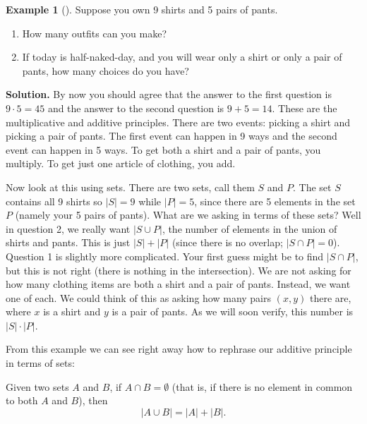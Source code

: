 \documentclass[12pt,]{book}
\theoremstyle{plain}
\theoremstyle{definition}
\theoremstyle{definition}
\newtheorem{example}[theorem]{Example}
\theoremstyle{definition}
\numberwithin{equation}{chapter}
\newcommand{\card}[1]{\left| #1 \right|}
\begin{document}
\begin{example}[]\label{example-39}
\hypertarget{p-731}{}%
Suppose you own 9 shirts and 5 pairs of pants.%
\par
\hypertarget{p-732}{}%
\leavevmode%
\begin{enumerate}
\item\hypertarget{li-345}{}\hypertarget{p-733}{}%
How many outfits can you make?%
\item\hypertarget{li-346}{}\hypertarget{p-734}{}%
If today is half-naked-day, and you will wear only a shirt or only a pair of pants, how many choices do you have?%
\end{enumerate}
%
\par\smallskip%
\noindent\textbf{Solution.}\hypertarget{solution-86}{}\quad%
\hypertarget{p-735}{}%
By now you should agree that the answer to the first question is \(9 \cdot 5 = 45\) and the answer to the second question is \(9 + 5 = 14\). These are the multiplicative and additive principles. There are two events: picking a shirt and picking a pair of pants. The first event can happen in 9 ways and the second event can happen in 5 ways. To get both a shirt and a pair of pants, you multiply. To get just one article of clothing, you add.%
\par
\hypertarget{p-736}{}%
Now look at this using sets. There are two sets, call them \(S\) and \(P\). The set \(S\) contains all 9 shirts so \(|S| = 9\) while \(|P| = 5\), since there are 5 elements in the set \(P\) (namely your 5 pairs of pants). What are we asking in terms of these sets? Well in question 2, we really want \(|S \cup P|\), the number of elements in the union of shirts and pants. This is just \(|S| + |P|\) (since there is no overlap; \(|S \cap P| = 0\)). Question 1 is slightly more complicated. Your first guess might be to find \(|S \cap P|\), but this is not right (there is nothing in the intersection). We are not asking for how many clothing items are both a shirt and a pair of pants. Instead, we want one of each. We could think of this as asking how many pairs \((x,y)\) there are, where \(x\) is a shirt and \(y\) is a pair of pants. As we will soon verify, this number is \(|S| \cdot |P|\).%
\end{example}
\hypertarget{p-737}{}%
From this example we can see right away how to rephrase our additive principle in terms of sets:%
\begin{assemblage}\label{assemblage-13}
\hypertarget{p-738}{}%
 Given two sets \(A\) and \(B\), if \(A \cap B = \emptyset\) (that is, if there is no element in common to both \(A\) and \(B\)), then%
\begin{equation*}
\card{A \cup B} = \card{A} + \card{B}.
\end{equation*}
%
\end{assemblage}
\end{document}
